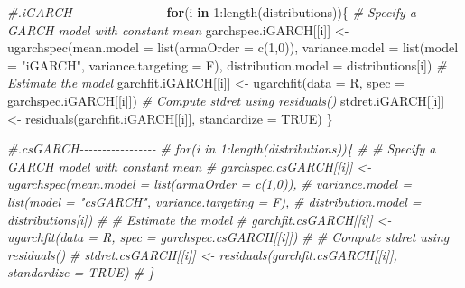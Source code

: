 \documentclass[a4paper, twoside]{templates/ociamthesis}
\newenvironment{Shaded}{\begin{snugshade}}{\end{snugshade}}
\newcommand{\AttributeTok}[1]{\textcolor[rgb]{0.77,0.63,0.00}{#1}}
\newcommand{\CommentTok}[1]{\textcolor[rgb]{0.56,0.35,0.01}{\textit{#1}}}
\newcommand{\ConstantTok}[1]{\textcolor[rgb]{0.00,0.00,0.00}{#1}}
\newcommand{\ControlFlowTok}[1]{\textcolor[rgb]{0.13,0.29,0.53}{\textbf{#1}}}
\newcommand{\DecValTok}[1]{\textcolor[rgb]{0.00,0.00,0.81}{#1}}
\newcommand{\FunctionTok}[1]{\textcolor[rgb]{0.00,0.00,0.00}{#1}}
\newcommand{\NormalTok}[1]{#1}
\newcommand{\OtherTok}[1]{\textcolor[rgb]{0.56,0.35,0.01}{#1}}
\newcommand{\SpecialCharTok}[1]{\textcolor[rgb]{0.00,0.00,0.00}{#1}}
\newcommand{\StringTok}[1]{\textcolor[rgb]{0.31,0.60,0.02}{#1}}
\renewenvironment{Shaded}
{
  \vspace{10pt}%
  \begin{snugshade}%
}{%
  \end{snugshade}%
  \vspace{8pt}%
}
\begin{document}
\begin{Shaded}
\begin{Highlighting}[]
\CommentTok{\#.iGARCH{-}{-}{-}{-}{-}{-}{-}{-}{-}{-}{-}{-}{-}{-}{-}{-}{-}{-}{-}{-}}
\ControlFlowTok{for}\NormalTok{(i }\ControlFlowTok{in} \DecValTok{1}\SpecialCharTok{:}\FunctionTok{length}\NormalTok{(distributions))\{}
\CommentTok{\# Specify a GARCH model with constant mean}
\NormalTok{garchspec.iGARCH[[i]] }\OtherTok{\textless{}{-}} \FunctionTok{ugarchspec}\NormalTok{(}\AttributeTok{mean.model =} \FunctionTok{list}\NormalTok{(}\AttributeTok{armaOrder =} \FunctionTok{c}\NormalTok{(}\DecValTok{1}\NormalTok{,}\DecValTok{0}\NormalTok{)),}
                     \AttributeTok{variance.model =} \FunctionTok{list}\NormalTok{(}\AttributeTok{model =} \StringTok{"iGARCH"}\NormalTok{, }\AttributeTok{variance.targeting =}\NormalTok{ F), }
                     \AttributeTok{distribution.model =}\NormalTok{ distributions[i])}
\CommentTok{\# Estimate the model}
\NormalTok{garchfit.iGARCH[[i]] }\OtherTok{\textless{}{-}} \FunctionTok{ugarchfit}\NormalTok{(}\AttributeTok{data =}\NormalTok{ R, }\AttributeTok{spec =}\NormalTok{ garchspec.iGARCH[[i]])}
\CommentTok{\# Compute stdret using residuals()}
\NormalTok{stdret.iGARCH[[i]] }\OtherTok{\textless{}{-}} \FunctionTok{residuals}\NormalTok{(garchfit.iGARCH[[i]], }\AttributeTok{standardize =} \ConstantTok{TRUE}\NormalTok{)}
\NormalTok{\}}

\CommentTok{\#.csGARCH{-}{-}{-}{-}{-}{-}{-}{-}{-}{-}{-}{-}{-}{-}{-}{-}{-}}
\CommentTok{\# for(i in 1:length(distributions))\{}
\CommentTok{\# \# Specify a GARCH model with constant mean}
\CommentTok{\# garchspec.csGARCH[[i]] \textless{}{-} ugarchspec(mean.model = list(armaOrder = c(1,0)),}
\CommentTok{\#                      variance.model = list(model = "csGARCH", variance.targeting = F),}
\CommentTok{\#                      distribution.model = distributions[i])}
\CommentTok{\# \# Estimate the model}
\CommentTok{\# garchfit.csGARCH[[i]] \textless{}{-} ugarchfit(data = R, spec = garchspec.csGARCH[[i]])}
\CommentTok{\# \# Compute stdret using residuals()}
\CommentTok{\# stdret.csGARCH[[i]] \textless{}{-} residuals(garchfit.csGARCH[[i]], standardize = TRUE)}
\CommentTok{\# \}}



\end{Highlighting}
\end{Shaded}
\end{document}

